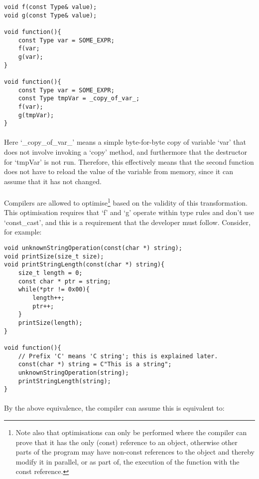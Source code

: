 \documentclass[12pt,twoside,notitlepage]{report}
\begin{document}
\begin{lstlisting}
void f(const Type& value);
void g(const Type& value);

void function(){
	const Type var = SOME_EXPR;
	f(var;
	g(var);
}

void function(){
	const Type var = SOME_EXPR;
	const Type tmpVar = _copy_of_var_;
	f(var);
	g(tmpVar);
}
\end{lstlisting}

\paragraph{}
Here `\_copy\_of\_var\_' means a simple byte-for-byte copy of variable `var' that does not involve invoking a `copy' method, and furthermore that the destructor for `tmpVar' is not run. Therefore, this effectively means that the second function does not have to reload the value of the variable from memory, since it can assume that it has not changed.

\paragraph{}
Compilers are allowed to optimise\footnote{Note also that optimisations can only be performed where the compiler can prove that it has the only (const) reference to an object, otherwise other parts of the program may have non-const references to the object and thereby modify it in parallel, or as part of, the execution of the function with the const reference.} based on the validity of this transformation. This optimisation requires that `f' and `g' operate within type rules and don't use `const\_cast', and this is a requirement that the developer must follow. Consider, for example:

\begin{lstlisting}
void unknownStringOperation(const(char *) string);
void printSize(size_t size);
void printStringLength(const(char *) string){
	size_t length = 0;
	const char * ptr = string;
	while(*ptr != 0x00){
		length++;
		ptr++;
	}
	printSize(length);
}

void function(){
	// Prefix 'C' means 'C string'; this is explained later.
	const(char *) string = C"This is a string";
	unknownStringOperation(string);
	printStringLength(string);
}
\end{lstlisting}

\paragraph{}
By the above equivalence, the compiler can assume this is equivalent to:
\end{document}
